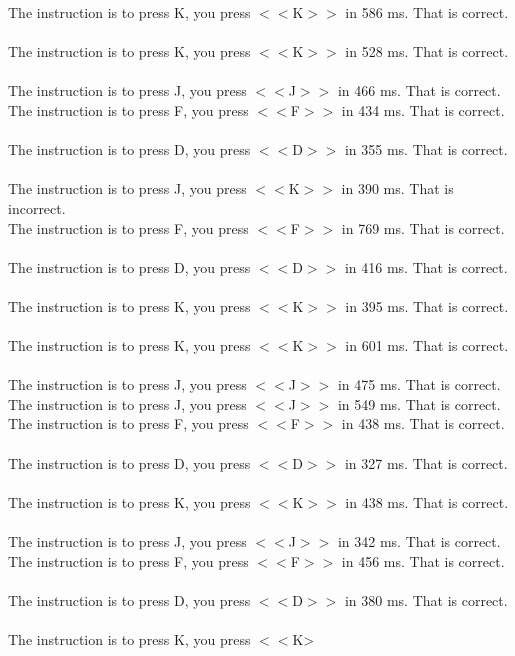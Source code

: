 \documentclass[pdflatex,sn-nature]{sn-jnl}%
\theoremstyle{thmstyleone}%
\theoremstyle{thmstyletwo}%
\theoremstyle{thmstylethree}%
\begin{document}
The instruction is to press K, you press $<<$K$>>$ in 586 ms. That is correct. $~$\\ 
The instruction is to press K, you press $<<$K$>>$ in 528 ms. That is correct. $~$\\ 
The instruction is to press J, you press $<<$J$>>$ in 466 ms. That is correct. $~$\\ 
The instruction is to press F, you press $<<$F$>>$ in 434 ms. That is correct. $~$\\ 
The instruction is to press D, you press $<<$D$>>$ in 355 ms. That is correct. $~$\\ 
The instruction is to press J, you press $<<$K$>>$ in 390 ms. That is incorrect. $~$\\ 
The instruction is to press F, you press $<<$F$>>$ in 769 ms. That is correct. $~$\\ 
The instruction is to press D, you press $<<$D$>>$ in 416 ms. That is correct. $~$\\ 
The instruction is to press K, you press $<<$K$>>$ in 395 ms. That is correct. $~$\\ 
The instruction is to press K, you press $<<$K$>>$ in 601 ms. That is correct. $~$\\ 
The instruction is to press J, you press $<<$J$>>$ in 475 ms. That is correct. $~$\\ 
The instruction is to press J, you press $<<$J$>>$ in 549 ms. That is correct. $~$\\ 
The instruction is to press F, you press $<<$F$>>$ in 438 ms. That is correct. $~$\\ 
The instruction is to press D, you press $<<$D$>>$ in 327 ms. That is correct. $~$\\ 
The instruction is to press K, you press $<<$K$>>$ in 438 ms. That is correct. $~$\\ 
The instruction is to press J, you press $<<$J$>>$ in 342 ms. That is correct. $~$\\ 
The instruction is to press F, you press $<<$F$>>$ in 456 ms. That is correct. $~$\\ 
The instruction is to press D, you press $<<$D$>>$ in 380 ms. That is correct. $~$\\ 
The instruction is to press K, you press $<<$K> 
\end{document}
